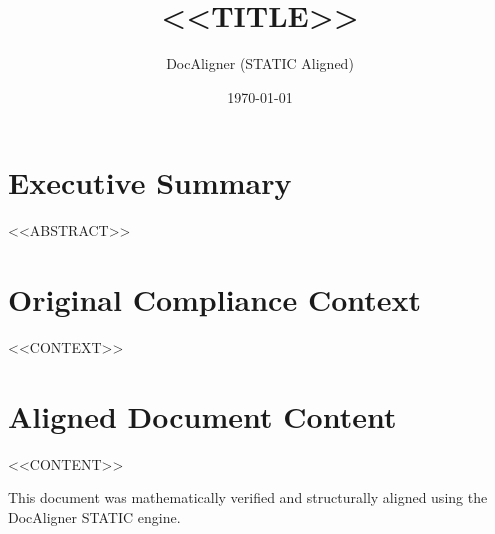 \documentclass{article}
\title{<<TITLE>>}
\author{DocAligner (STATIC Aligned)}
\date{\today}
\begin{document}
\maketitle

\section*{Executive Summary}
<<ABSTRACT>>

\section*{Original Compliance Context}
<<CONTEXT>>

\section*{Aligned Document Content}
<<CONTENT>>

\vfill
\begin{center}
    \small \color{gray}
    This document was mathematically verified and structurally aligned using the DocAligner STATIC engine.
\end{center}
\end{document}

